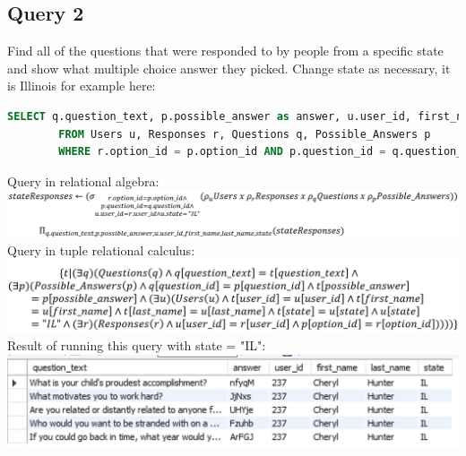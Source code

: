 \documentclass[12pt, oneside, a4paper]{article}
\begin{document}
    \subsection*{Query 2}
    \noindent Find all of the questions that were responded to by people from a specific state and show what multiple choice answer they picked. Change state as necessary, it is Illinois for example here:
    \begin{lstlisting}[language=SQL, columns=flexible, breaklines]
        SELECT q.question_text, p.possible_answer as answer, u.user_id, first_name, last_name, state
        FROM Users u, Responses r, Questions q, Possible_Answers p
        WHERE r.option_id = p.option_id AND p.question_id = q.question_id AND u.user_id = r.user_id AND state = "IL";
    \end{lstlisting}
    \noindent Query in relational algebra: \\
    \includegraphics[scale=0.6]{questionstatequeryalgebra.PNG}
    \noindent Query in tuple relational calculus: \\
    \includegraphics[scale=0.7]{questionstatequerycalculus3.PNG}
    Result of running this query with state = "IL":\\
    \includegraphics{questionstatequeryresult.PNG}
\end{document}
